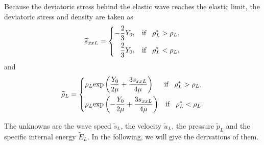 \documentclass{article}
\numberwithin{equation}{section}
\numberwithin{table}{section}
\begin{document}
Because the deviatoric stress behind the elastic wave reaches the elastic limit, the deviatoric stress and density are taken as
\begin{equation}
  \widetilde{s}_{xxL} =\left\{ \begin{aligned}
	  -\frac{2}{3}Y_0, \hspace{0.3cm} \text{if} \hspace{0.3cm} \rho_L^* > \rho_L,\\
	  \frac{2}{3}Y_0, \hspace{0.3cm} \text{if} \hspace{0.3cm} \rho_L^* < \rho_L,\\
	\end{aligned}\right.
  \end{equation}
  and
\begin{equation}   \widetilde{\rho}_{L} = \left\{ \begin{aligned}
	  & \rho_L \text{exp}\left(\frac{Y_0}{2\mu}+\frac{3 s_{xxL}}{4\mu}\right)  \hspace{0.5cm} \text{if} \hspace{0.3cm} \rho_L^* > \rho_L,\\
& \rho_L \text{exp}\left(-\frac{Y_0}{2\mu}+\frac{3 s_{xxL}}{4\mu}\right)
\hspace{0.3cm} \text{if} \hspace{0.3cm} \rho_L^* < \rho_L.\\
  \end{aligned}\right.
 \end{equation}

 The unknowns are the wave speed $\widetilde{s}_L$,  the velocity  $\widetilde{u}_L$, the pressure $\widetilde{p}_L$ and the specific internal energy $\widetilde{E}_L$. In the following, we will give the derivations of them.
\end{document}
